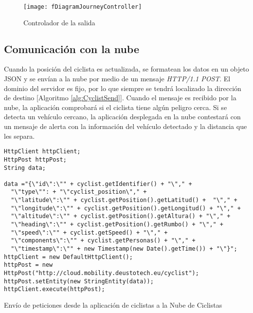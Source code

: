 \begin{figure}[h]
	\begin{center}
	\texttt{[image: fDiagramJourneyController]}
	\caption{Controlador de la salida}
	\label{figure:DiagramController}
	\end{center}
\end{figure}
		
\subsection{Comunicación con la nube}\label{ssection:comunicacion_nube}
Cuando la posición del ciclista es actualizada, se formatean los datos en un objeto JSON y se envían a la nube por medio de un mensaje \emph{HTTP/1.1 POST}. El dominio del servidor es fijo, por lo que siempre se tendrá localizado la dirección de destino [Algoritmo \ref{alg:CyclistSend}]. Cuando el mensaje es recibido por la nube, la aplicación comprobará si el ciclista tiene algún peligro cerca. Si se detecta un vehículo cercano, la aplicación desplegada en la nube contestará con un mensaje de alerta con la información del vehículo detectado y la distancia que les separa.

\begin{listing}
	\begin{minipage}{.4\textwidth}
		\begin{verbatim}
HttpClient httpClient;
HttpPost httpPost;
String data;
							
data ="{\"id\":\"" + cyclist.getIdentifier() + "\"," +
  "\"type\"": + "\"cyclist_position\"," +
  "\"latitude\":\"" + cyclist.getPosition().getLatitud() +  "\"," +
  "\"longitude\":\"" + cyclist.getPosition().getLongitud() + "\"," +
  "\"altitude\":\"" + cyclist.getPosition().getAltura() + "\"," +
  "\"heading\":\"" + cyclist.getPosition().getRumbo() + "\"," +
  "\"speed\":\"" + cyclist.getSpeed() + "\"," +
  "\"components\":\"" + cyclist.getPersonas() + "\"," +
  "\"timestamp\":\"" + new Timestamp(new Date().getTime()) + "\"}";
httpClient = new DefaultHttpClient();
httpPost = new HttpPost("http://cloud.mobility.deustotech.eu/cyclist");
httpPost.setEntity(new StringEntity(data));
httpClient.execute(httpPost);
		\end{verbatim}
	\end{minipage}
	\caption{Envío de peticiones desde la aplicación de ciclistas a la Nube de Ciclistas}\label{alg:CyclistSend}
\end{listing}

